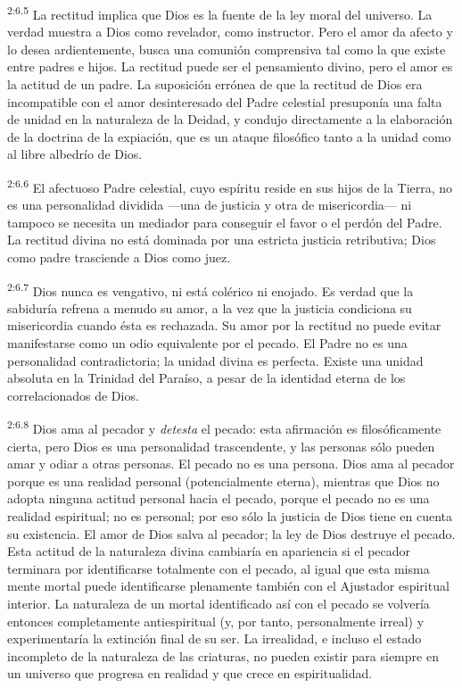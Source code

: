 \par
\textsuperscript{2:6.5} La rectitud implica que Dios es la fuente de la ley moral del universo. La verdad muestra a Dios como revelador, como instructor. Pero el amor da afecto y lo desea ardientemente, busca una comunión comprensiva tal como la que existe entre padres e hijos. La rectitud puede ser el pensamiento divino, pero el amor es la actitud de un padre. La suposición errónea de que la rectitud de Dios era incompatible con el amor desinteresado del Padre celestial presuponía una falta de unidad en la naturaleza de la Deidad, y condujo directamente a la elaboración de la doctrina de la expiación, que es un ataque filosófico tanto a la unidad como al libre albedrío de Dios.

\par
\textsuperscript{2:6.6} El afectuoso Padre celestial, cuyo espíritu reside en sus hijos de la Tierra, no es una personalidad dividida ---una de justicia y otra de misericordia--- ni tampoco se necesita un mediador para conseguir el favor o el perdón del Padre. La rectitud divina no está dominada por una estricta justicia retributiva; Dios como padre trasciende a Dios como juez.

\par
\textsuperscript{2:6.7} Dios nunca es vengativo, ni está colérico ni enojado. Es verdad que la sabiduría refrena a menudo su amor, a la vez que la justicia condiciona su misericordia cuando ésta es rechazada. Su amor por la rectitud no puede evitar manifestarse como un odio equivalente por el pecado. El Padre no es una personalidad contradictoria; la unidad divina es perfecta. Existe una unidad absoluta en la Trinidad del Paraíso, a pesar de la identidad eterna de los correlacionados de Dios.

\par
\textsuperscript{2:6.8} Dios ama al pecador y \textit{detesta} el pecado: esta afirmación es filosóficamente cierta, pero Dios es una personalidad trascendente, y las personas sólo pueden amar y odiar a otras personas. El pecado no es una persona. Dios ama al pecador porque es una realidad personal
(potencialmente eterna), mientras que Dios no adopta ninguna actitud personal hacia el pecado, porque el pecado no es una realidad espiritual; no es personal; por eso sólo la justicia de Dios tiene en cuenta su existencia. El amor de Dios salva al pecador; la ley de Dios destruye el pecado. Esta actitud de la naturaleza divina cambiaría en apariencia si el pecador terminara por identificarse totalmente con el pecado, al igual que esta misma mente mortal puede identificarse plenamente también con el Ajustador espiritual interior. La naturaleza de un mortal identificado así con el pecado se volvería entonces completamente antiespiritual (y, por tanto, personalmente irreal) y experimentaría la extinción final de su ser. La irrealidad, e incluso el estado incompleto de la naturaleza de las criaturas, no pueden existir para siempre en un universo que progresa en realidad y que crece en espiritualidad.

